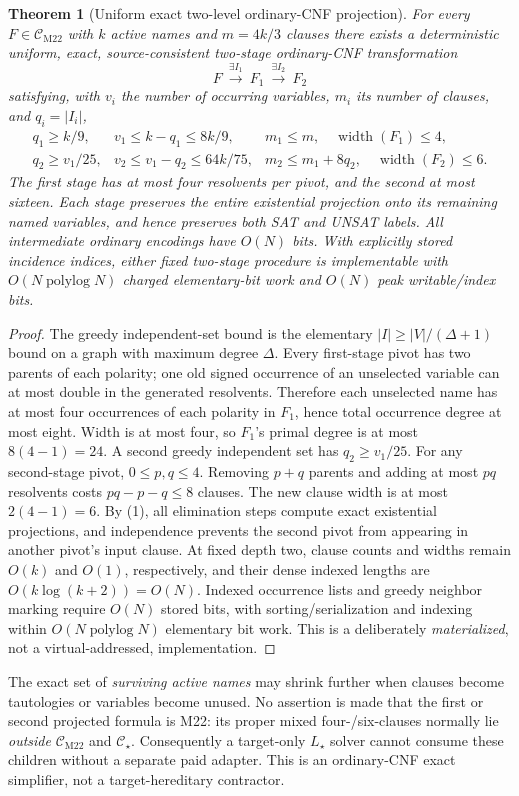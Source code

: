 \documentclass[11pt]{article}
\newtheorem{theorem}{Theorem}
\newcommand{\CM}{\mathcal C_{\mathrm{M22}}}
\newcommand{\CS}{\mathcal C_\star}
\begin{document}
\begin{theorem}[Uniform exact two-level ordinary-CNF projection]
For every \(F\in\CM\) with \(k\) active names and \(m=4k/3\) clauses
there exists a deterministic uniform, exact, source-consistent
two-stage ordinary-CNF transformation
\[
F\ \xrightarrow{\exists I_1}\ F_1\
\xrightarrow{\exists I_2}\ F_2
\]
satisfying, with \(v_i\) the number of \emph{occurring} variables,
\(m_i\) its number of clauses, and \(q_i=|I_i|\),
\[
\begin{array}{lll}
q_1\ge k/9,&v_1\le k-q_1\le8k/9,&m_1\le m,\quad
\operatorname{width}(F_1)\le4,\\
q_2\ge v_1/25,&v_2\le v_1-q_2\le64k/75,&
m_2\le m_1+8q_2,\quad\operatorname{width}(F_2)\le6.
\end{array}\tag{3}
\]
The first stage has at most four resolvents per pivot, and the
second at most sixteen. Each stage preserves the entire
existential projection onto its remaining named variables,
and hence preserves both SAT and UNSAT labels.
All intermediate ordinary encodings have \(O(N)\) bits.
With explicitly stored incidence indices, either fixed two-stage
procedure is implementable with \(O(N\operatorname{polylog}N)\)
charged elementary-bit work and \(O(N)\) peak writable/index bits.
\end{theorem}
\begin{proof}
The greedy independent-set bound is the elementary
\(|I|\ge |V|/(\Delta+1)\) bound on a graph with maximum degree
\(\Delta\). Every first-stage pivot has two parents of each polarity;
one old signed occurrence of an unselected variable can at most
double in the generated resolvents. Therefore each unselected name
has at most four occurrences of each polarity in \(F_1\), hence
total occurrence degree at most eight. Width is at most four,
so \(F_1\)'s primal degree is at most \(8(4-1)=24\).
A second greedy independent set has \(q_2\ge v_1/25\).
For any second-stage pivot, \(0\le p,q\le4\). Removing \(p+q\)
parents and adding at most \(pq\) resolvents costs
\(pq-p-q\le8\) clauses. The new clause width is at most
\(2(4-1)=6\). By (1), all elimination steps compute exact
existential projections, and independence prevents the second
pivot from appearing in another pivot's input clause.
At fixed depth two, clause counts and widths remain \(O(k)\)
and \(O(1)\), respectively, and their dense indexed lengths
are \(O(k\log(k+2))=O(N)\). Indexed occurrence lists and
greedy neighbor marking require \(O(N)\) stored bits, with
sorting/serialization and indexing within \(O(N\operatorname{polylog}N)\)
elementary bit work. This is a deliberately \emph{materialized},
not a virtual-addressed, implementation.
\end{proof}
\noindent The exact set of \emph{surviving active names} may shrink
further when clauses become tautologies or variables become unused.
No assertion is made that the first or second projected formula is
M22: its proper mixed four-/six-clauses normally lie \emph{outside}
\(\CM\) and \(\CS\). Consequently a target-only \(L_\star\) solver
cannot consume these children without a separate paid adapter.
This is an ordinary-CNF exact simplifier, not a target-hereditary contractor.
\end{document}
